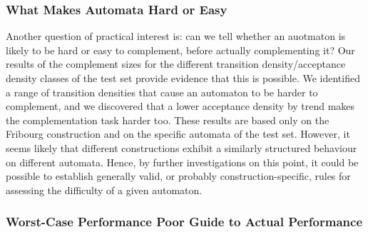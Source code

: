 
\subsubsection{What Makes Automata Hard or Easy}
Another question of practical interest is: can we tell whether an auotmaton is likely to be hard or easy to complement, before actually complementing it? Our results of the complement sizes for the different transition density/acceptance density classes of the \goal{} test set provide evidence that this is possible. We identified a range of transition densities that cause an automaton to be harder to complement, and we discovered that a lower acceptance density by trend makes the complementation task harder too. These results are based only on the Fribourg construction and on the specific automata of the \goal{} test set. However, it seems likely that different constructions exhibit a similarly structured behaviour on different automata. Hence, by further investigations on this point, it could be possible to establish generally valid, or probably construction-specific, rules for assessing the difficulty of a given automaton.


\subsubsection{Worst-Case Performance Poor Guide to Actual Performance}



